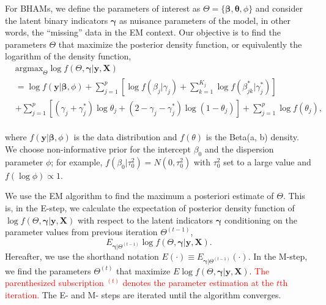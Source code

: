 \documentclass[AMA,STIX1COL,]{WileyNJD-v2}
\begin{document}
For BHAMs, we define the parameters of interest as
\(\Theta = \{\boldsymbol{\beta}, \boldsymbol{\theta}, \phi\}\) and
consider the latent binary indicators \(\boldsymbol{\gamma}\) as
nuisance parameters of the model, in other words, the ``missing'' data
in the EM context. Our objective is to find the parameters \(\Theta\)
that maximize the posterior density function, or equivalently the
logarithm of the density function, \[
\begin{aligned}
& \text{argmax}_{\Theta}
\log f(\Theta, \boldsymbol{\gamma}| \textbf{y}, \textbf{X}) \\
&= \log f(\textbf{y}|\boldsymbol{\beta}, \phi) + \sum\limits_{j=1}^p\left[\log f(\beta_j|\gamma_j)+\sum\limits_{k=1}^{K_j} \log f(\beta^{*}_{jk}|\gamma^{*}_{j})\right]\\
& +\sum\limits_{j=1}^{p} \left[ (\gamma_j+\gamma_{j}^{*})\log \theta_j + (2-\gamma_j-\gamma_{j}^{*}) \log (1-\theta_j)\right] +  \sum\limits_{j=1}^{p}\log f(\theta_j),
\end{aligned}
\]\\
where \(f(\textbf{y}|\boldsymbol{\beta}, \phi)\) is the data
distribution and \(f(\theta)\) is the Beta(a, b) density. We choose
non-informative prior for the intercept \(\beta_0\) and the dispersion
parameter \(\phi\); for example, \(f(\beta_0|\tau_0^2)=N(0,\tau_0^2)\)
with \(\tau^2_0\) set to a large value and \(f(\log \phi) \propto 1\).

We use the EM algorithm to find the maximum a posteriori estimate of
\(\Theta\). This is, in the E-step, we calculate the expectation of
posterior density function of
\(\log f(\Theta, \boldsymbol{\gamma}| \textbf{y}, \textbf{X})\) with
respect to the latent indicators \(\boldsymbol{\gamma}\) conditioning on
the parameter values from previous iteration \(\Theta^{(t-1)}\), \[
E_{\boldsymbol{\gamma}|\Theta^{(t-1)}}\log f(\Theta, \boldsymbol{\gamma}| \textbf{y}, \textbf{X}) .
\] Hereafter, we use the shorthand notation
\(E(\cdot)\equiv E_{\boldsymbol{\gamma}|\Theta^{(t-1)}}(\cdot)\). In the
M-step, we find the parameters \(\Theta^{(t)}\) that maximize
\(E\log f(\Theta, \boldsymbol{\gamma}| \textbf{y}, \textbf{X})\).
\textcolor{red}{The parenthesized subscription $^{(t)}$ denotes the parameter estimation at the $t$th iteration.}
The E- and M- steps are iterated until the algorithm converges.
\end{document}
